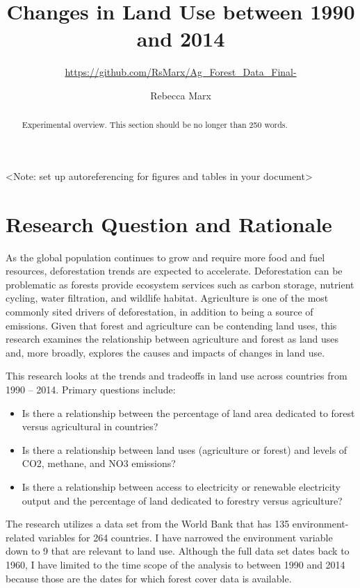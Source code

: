 \documentclass[12pt,]{article}
\title{Changes in Land Use between 1990 and 2014}
\subtitle{\url{https://github.com/RsMarx/Ag_Forest_Data_Final-}}
\author{Rebecca Marx}
\date{}
\providecommand{\tightlist}{%
  \setlength{\itemsep}{0pt}\setlength{\parskip}{0pt}}
\begin{document}
\maketitle
\begin{abstract}
Experimental overview. This section should be no longer than 250 words.
\end{abstract}

\newpage

\tableofcontents  \newpage
\listoftables  \newpage
\listoffigures  \newpage

\textless{}Note: set up autoreferencing for figures and tables in your
document\textgreater{}

\section{Research Question and
Rationale}\label{research-question-and-rationale}

As the global population continues to grow and require more food and
fuel resources, deforestation trends are expected to accelerate.
Deforestation can be problematic as forests provide ecosystem services
such as carbon storage, nutrient cycling, water filtration, and wildlife
habitat. Agriculture is one of the most commonly sited drivers of
deforestation, in addition to being a source of emissions. Given that
forest and agriculture can be contending land uses, this research
examines the relationship between agriculture and forest as land uses
and, more broadly, explores the causes and impacts of changes in land
use.

This research looks at the trends and tradeoffs in land use across
countries from 1990 -- 2014. Primary questions include:

\begin{itemize}
\tightlist
\item
  Is there a relationship between the percentage of land area dedicated
  to forest versus agricultural in countries?
\item
  Is there a relationship between land uses (agriculture or forest) and
  levels of CO2, methane, and NO3 emissions?
\item
  Is there a relationship between access to electricity or renewable
  electricity output and the percentage of land dedicated to forestry
  versus agriculture?
\end{itemize}

The research utilizes a data set from the World Bank that has 135
environment-related variables for 264 countries. I have narrowed the
environment variable down to 9 that are relevant to land use. Although
the full data set dates back to 1960, I have limited to the time scope
of the analysis to between 1990 and 2014 because those are the dates for
which forest cover data is available.
\end{document}
